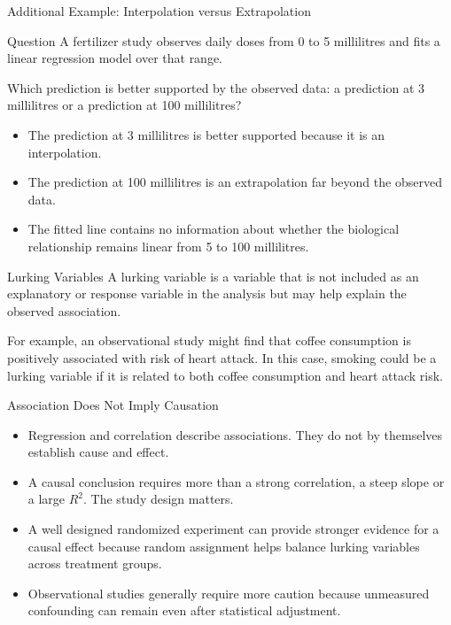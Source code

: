 \documentclass[aspectratio=169]{beamer}
\begin{document}
\begin{frame}{Additional Example: Interpolation versus Extrapolation}
\begin{block}{Question}
A fertilizer study observes daily doses from 0 to 5 millilitres and fits a linear regression model over that range.

Which prediction is better supported by the observed data: a prediction at 3 millilitres or a prediction at 100 millilitres?
\end{block}
\begin{itemize}
	\item The prediction at 3 millilitres is better supported because it is an interpolation.
	\item The prediction at 100 millilitres is an extrapolation far beyond the observed data.
	\item The fitted line contains no information about whether the biological relationship remains linear from 5 to 100 millilitres.
\end{itemize}
\end{frame}

\begin{frame}{Lurking Variables}
A lurking variable is a variable that is not included as an explanatory or response variable in the analysis but may help explain the observed association.

\vspace{0.15cm}
For example, an observational study might find that coffee consumption is positively associated with risk of heart attack. In this case, smoking could be a lurking variable if it is related to both coffee consumption and heart attack risk.
\end{frame}

\begin{frame}{Association Does Not Imply Causation}
\begin{itemize}
	\item Regression and correlation describe associations. They do not by themselves establish cause and effect.
	\item A causal conclusion requires more than a strong correlation, a steep slope or a large $R^2$. The study design matters.
	\item A well designed randomized experiment can provide stronger evidence for a causal effect because random assignment helps balance lurking variables across treatment groups.
	\item Observational studies generally require more caution because unmeasured confounding can remain even after statistical adjustment.
\end{itemize}
\end{frame}
\end{document}
